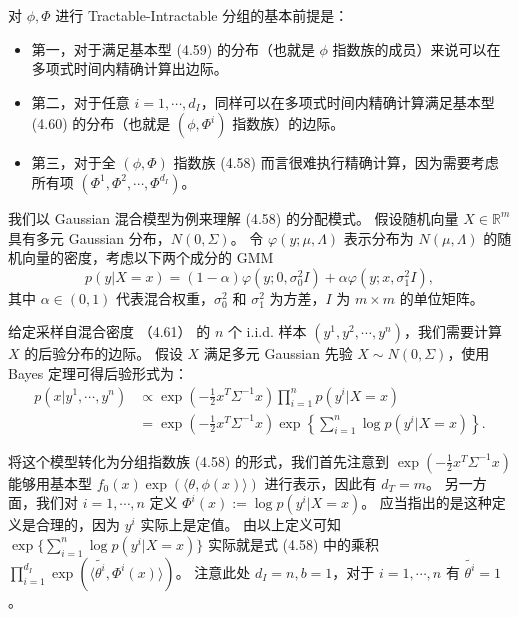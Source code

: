 对 $\phi, \Phi$ 进行 Tractable-Intractable 分组的基本前提是：
\begin{itemize}
    \item 第一，对于满足基本型 (4.59) 的分布（也就是 $\phi$ 指数族的成员）来说可以在多项式时间内精确计算出边际。
    \item 第二，对于任意 $i = 1, \cdots, d_I$，同样可以在多项式时间内精确计算满足基本型 (4.60) 的分布（也就是 $(\phi, \Phi^i)$ 指数族）的边际。
    \item 第三，对于全 $(\phi, \Phi)$ 指数族 (4.58) 而言很难执行精确计算，因为需要考虑所有项 $(\Phi^1, \Phi^2, \cdots, \Phi^{d_I})$。
\end{itemize}

\begin{tcolorbox}
\begin{exam}

我们以 Gaussian 混合模型为例来理解 (4.58) 的分配模式。
假设随机向量 $X \in \mathbb{R}^m$ 具有多元 Gaussian 分布，$N(0, \Sigma)$。
令 $\varphi(y; \mu, \Lambda)$ 表示分布为 $N(\mu, \Lambda)$ 的随机向量的密度，考虑以下两个成分的 GMM
\begin{equation}
    p(y| X = x) = (1-\alpha)\varphi(y; 0, \sigma_0^2I) + \alpha\varphi(y; x, \sigma_1^2I), 
\end{equation}
其中 $\alpha \in (0, 1)$ 代表混合权重，$\sigma_0^2$ 和 $\sigma_1^2$ 为方差，$I$ 为 $m \times m$ 的单位矩阵。

给定采样自混合密度 （4.61） 的 $n$ 个 i.i.d. 样本 $(y^1, y^2, \cdots, y^n)$，我们需要计算 $X$ 的后验分布的边际。
假设 $X$ 满足多元 Gaussian 先验 $X \sim N(0, \Sigma)$，使用 Bayes 定理可得后验形式为：
\begin{align}
    p(x|y^1, \cdots, y^n) &\propto \exp(-\frac{1}{2}x^T\Sigma^{-1}x)\prod_{i = 1}^np(y^i|X = x) \nonumber \\
    &= \exp(-\frac{1}{2}x^T\Sigma^{-1}x)\exp\left\{\sum_{i = 1}^n\log p(y^i|X = x)\right\}.
\end{align}

将这个模型转化为分组指数族 (4.58) 的形式，我们首先注意到 $\exp(-\frac{1}{2}x^T\Sigma^{-1}x)$ 能够用基本型 $f_0(x)\exp(\langle\theta, \phi(x)\rangle)$ 进行表示，因此有 $d_T = m$。
另一方面，我们对 $i = 1, \cdots, n$ 定义 $\Phi^i(x) := \log p(y^i|X = x)$。
应当指出的是这种定义是合理的，因为 $y^i$ 实际上是定值。
由以上定义可知 $\exp\{\sum_{i = 1}^n\log p(y^i|X = x)\}$ 实际就是式 (4.58) 中的乘积 $\prod_{i = 1}^{d_I}\exp(\langle\tilde{\theta^i}, \Phi^i(x)\rangle)$。
注意此处 $d_I = n, b = 1$，对于 $i = 1, \cdots, n$ 有 $\tilde{\theta^i} = 1$。


\end{exam}
\end{tcolorbox}
